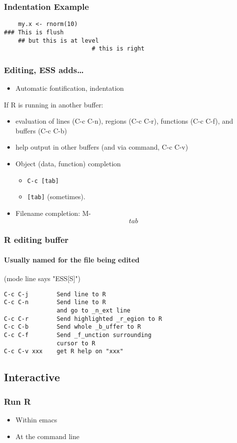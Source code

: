 \documentclass{beamer}
\begin{document}
\begin{frame}[fragile]
  \frametitle{Indentation Example}
\begin{verbatim}
    my.x <- rnorm(10)
### This is flush
    ## but this is at level
                         # this is right
\end{verbatim}
\end{frame}


\begin{frame}[fragile]
  \frametitle{Editing, ESS adds\ldots}
  \begin{itemize}
  \item Automatic fontification, indentation
  \end{itemize}
  If R is running in another buffer:
  \begin{itemize}
  \item evaluation of lines (C-c C-n), regions (C-c C-r), functions
    (C-c C-f), and buffers (C-c C-b)
  \item help output in other buffers (and via command, C-c C-v)
  \item Object (data, function) completion
    \begin{itemize}
    \item \verb+C-c [tab]+ 
    \item \verb+[tab]+ (sometimes).
    \end{itemize}
  \item Filename completion: M-\[tab\]
  \end{itemize}
\end{frame}

\begin{frame}[fragile]
  \frametitle{R editing buffer}
  \framesubtitle{Usually named for the file being edited}
  (mode line says "ESS[S]")
\begin{verbatim}
C-c C-j        Send line to R
C-c C-n        Send line to R 
               and go to _n_ext line
C-c C-r        Send highlighted _r_egion to R
C-c C-b        Send whole _b_uffer to R
C-c C-f        Send _f_unction surrounding
               cursor to R
C-c C-v xxx    get R help on "xxx"
\end{verbatim}
\end{frame}

\subsection{Interactive}

\begin{frame}
  \frametitle{Run R}
  \begin{itemize}
  \item Within emacs
  \item At the command line
  \end{itemize}
\end{frame}
\end{document}
